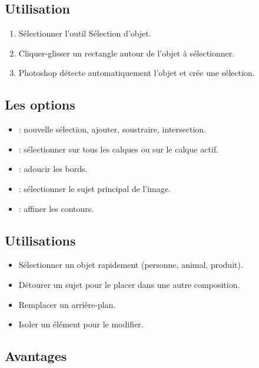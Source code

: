 \subsection{Utilisation}

\begin{enumerate}
    \item Sélectionner l'outil Sélection d'objet.
    \item Cliquer-glisser un rectangle autour de l'objet à sélectionner.
    \item Photoshop détecte automatiquement l'objet et crée une sélection.
\end{enumerate}

\subsection{Les options}

\begin{itemize}
    \item {} : nouvelle sélection, ajouter, soustraire, intersection.
    \item {} : sélectionner sur tous les calques ou sur le calque actif.
    \item {} : adoucir les bords.
    \item {} : sélectionner le sujet principal de l'image.
    \item {} : affiner les contours.
\end{itemize}

\subsection{Utilisations}

\begin{itemize}
    \item Sélectionner un objet rapidement (personne, animal, produit).
    \item Détourer un sujet pour le placer dans une autre composition.
    \item Remplacer un arrière-plan.
    \item Isoler un élément pour le modifier.
\end{itemize}

\subsection{Avantages}

